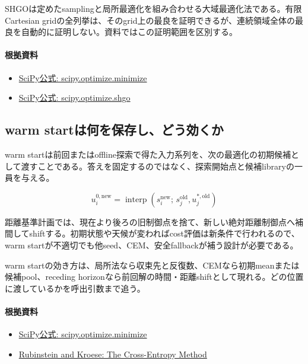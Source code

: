 \documentclass[a4paper,11pt]{article}
\begin{document}
SHGOは定めたsamplingと局所最適化を組み合わせる大域最適化法である。有限Cartesian gridの全列挙は、そのgrid上の最良を証明できるが、連続領域全体の最良を自動的に証明しない。資料ではこの証明範囲を区別する。

\paragraph{根拠資料}
\begin{itemize}[leftmargin=1.6em]
\item \href{https://docs.scipy.org/doc/scipy/reference/generated/scipy.optimize.minimize.html}{SciPy公式: scipy.optimize.minimize}
\item \href{https://docs.scipy.org/doc/scipy/reference/generated/scipy.optimize.shgo.html}{SciPy公式: scipy.optimize.shgo}
\end{itemize}

\subsection{warm startは何を保存し、どう効くか}
warm startは前回またはoffline探索で得た入力系列を、次の最適化の初期候補として渡すことである。答えを固定するのではなく、探索開始点と候補libraryの一員を与える。


\[
u^{0,\mathrm{new}}_i=\operatorname{interp}\left(s_i^{\mathrm{new}};\,s_j^{\mathrm{old}},u_j^{\ast,\mathrm{old}}\right)
\]

距離基準計画では、現在より後ろの旧制御点を捨て、新しい絶対距離制御点へ補間してshiftする。初期状態や天候が変わればcost評価は新条件で行われるので、warm startが不適切でも他seed、CEM、安全fallbackが補う設計が必要である。


warm startの効き方は、局所法なら収束先と反復数、CEMなら初期meanまたは候補pool、receding horizonなら前回解の時間・距離shiftとして現れる。どの位置に渡しているかを呼出引数まで追う。

\paragraph{根拠資料}
\begin{itemize}[leftmargin=1.6em]
\item \href{https://docs.scipy.org/doc/scipy/reference/generated/scipy.optimize.minimize.html}{SciPy公式: scipy.optimize.minimize}
\item \href{https://link.springer.com/book/10.1007/978-1-4757-4321-0}{Rubinstein and Kroese: The Cross-Entropy Method}
\end{itemize}
\end{document}
